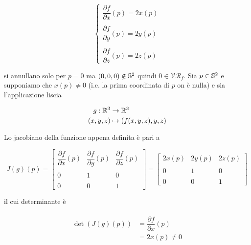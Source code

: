 \begin{equation}
	\begin{cases}
		\dfrac{\partial f}{\partial x} (p) = 2x(p)\\\\
		\dfrac{\partial f}{\partial y} (p) = 2y(p)\\\\
		\dfrac{\partial f}{\partial z} (p) = 2z(p)
	\end{cases}
\end{equation}

si annullano solo per $ p=0 $ ma $ (0,0,0) \notin \S^{2} $ quindi $ 0 \in \mathcal{VR}_{f} $.
Sia $ p \in \S^{2} $ e supponiamo che $ x(p) \neq 0 $ (i.e. la prima coordinata di $ p $ on è nulla) e sia l'applicazione liscia

\begin{align}
	\begin{split}
		g : \R^{3} &\to \R^{3}\\
		(x,y,z) &\mapsto (f(x,y,z),y,z)
	\end{split}
\end{align}

Lo jacobiano della funzione appena definita è pari a

\begin{equation}
	J(g)(p) = \begin{bmatrix} \dfrac{\partial f}{\partial x} (p) & \dfrac{\partial f}{\partial y} (p) & \dfrac{\partial f}{\partial z} (p) \\\\ 0 & 1 & 0 \\\\ 0 & 0 & 1 \end{bmatrix} = \begin{bmatrix} 2x(p) & 2y(p) & 2z(p) \\\\ 0 & 1 & 0 \\\\ 0 & 0 & 1 \end{bmatrix}
\end{equation}

il cui determinante è

\begin{align}
	\begin{split}
		\det(J(g)(p)) &= \dfrac{\partial f}{\partial x} (p)\\
		&= 2x(p) \neq 0
	\end{split}
\end{align}

